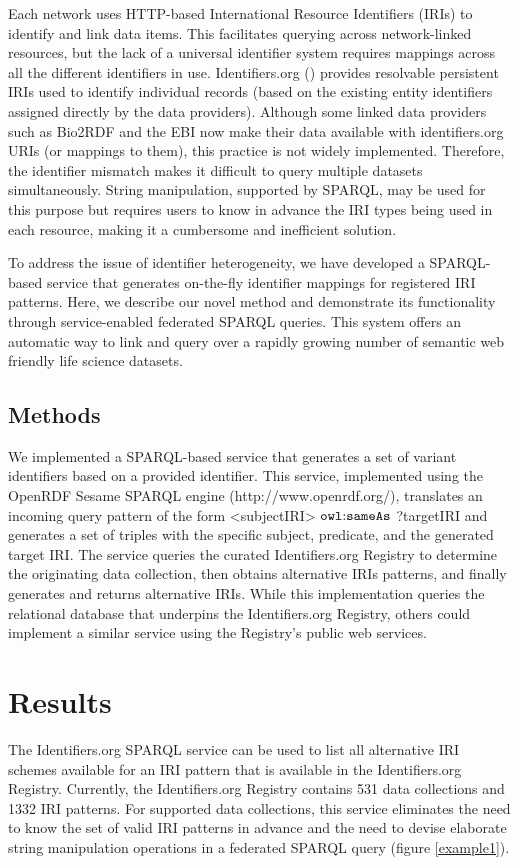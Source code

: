 \documentclass{bioinfo}
\begin{document}
Each network uses HTTP-based International Resource Identifiers (IRIs) to identify and link data items. This facilitates querying across network-linked resources, but the lack of a universal identifier system requires mappings across all the different identifiers in use. Identifiers.org (\cite{Juty01012012}) provides resolvable persistent IRIs used to identify individual records (based on the existing entity identifiers assigned directly by the data providers). Although some linked data providers such as Bio2RDF and the EBI now make their data available with identifiers.org URIs (or mappings to them), this practice is not widely implemented. Therefore, the identifier mismatch makes it difficult to query multiple datasets simultaneously.  String manipulation, supported by SPARQL, may be used for this purpose but requires users to know in advance the IRI types being used in each resource, making it a cumbersome and inefficient solution. 
 
To address the issue of identifier heterogeneity, we have developed a SPARQL-based service that generates on-the-fly identifier mappings for registered IRI patterns. Here, we describe our novel method and demonstrate its functionality through service-enabled federated SPARQL queries. This system offers an automatic way to link and query over a rapidly growing number of semantic web friendly life science datasets.

\begin{methods}
\section{Methods}
We implemented a SPARQL-based service that generates a set of variant identifiers based on a provided identifier. This service, implemented using the OpenRDF Sesame SPARQL engine (http://www.openrdf.org/), translates an incoming query pattern of the form <subjectIRI> $\mathtt{owl\text{\rm :}{}sameAs}$ ?targetIRI and generates a set of triples with the specific subject, predicate, and the generated target IRI. The service queries the curated Identifiers.org Registry to determine the originating data collection, then obtains alternative IRIs patterns, and finally generates and returns alternative IRIs. While this implementation queries the relational database that underpins the Identifiers.org Registry, others could implement a similar service using the Registry's public web services.
\end{methods}

\section{Results}
The Identifiers.org SPARQL service can be used to list all alternative IRI schemes available for an IRI pattern that is available in the Identifiers.org Registry. Currently, the Identifiers.org Registry contains 531 data collections and 1332 IRI patterns. For supported data collections, this service eliminates the need to know the set of valid IRI patterns in advance and the need to devise elaborate string manipulation operations in a federated SPARQL query (figure \ref{example1}).
\end{document}
